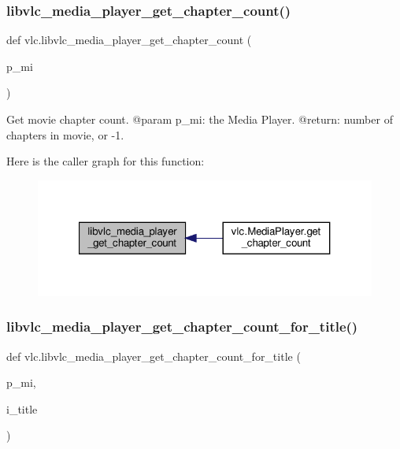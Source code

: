 \subsubsection{\texorpdfstring{libvlc\+\_\+media\+\_\+player\+\_\+get\+\_\+chapter\+\_\+count()}{libvlc\_media\_player\_get\_chapter\_count()}}
{\footnotesize\ttfamily def vlc.\+libvlc\+\_\+media\+\_\+player\+\_\+get\+\_\+chapter\+\_\+count (\begin{DoxyParamCaption}\item[{}]{p\+\_\+mi }\end{DoxyParamCaption})}

\begin{DoxyVerb}Get movie chapter count.
@param p_mi: the Media Player.
@return: number of chapters in movie, or -1.
\end{DoxyVerb}
 Here is the caller graph for this function\+:
\nopagebreak
\begin{figure}[H]
\begin{center}
\leavevmode
\includegraphics[width=321pt]{namespacevlc_aff9bc2c045b943e08689f0880af3c9ff_icgraph}
\end{center}
\end{figure}
\mbox{\label{namespacevlc_a9c238cb76d091ddb073f43ec17c559df}} 
\subsubsection{\texorpdfstring{libvlc\+\_\+media\+\_\+player\+\_\+get\+\_\+chapter\+\_\+count\+\_\+for\+\_\+title()}{libvlc\_media\_player\_get\_chapter\_count\_for\_title()}}
{\footnotesize\ttfamily def vlc.\+libvlc\+\_\+media\+\_\+player\+\_\+get\+\_\+chapter\+\_\+count\+\_\+for\+\_\+title (\begin{DoxyParamCaption}\item[{}]{p\+\_\+mi,  }\item[{}]{i\+\_\+title }\end{DoxyParamCaption})}

